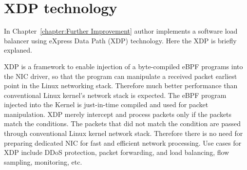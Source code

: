 \FloatBarrier

\section{XDP technology}

In Chapter~\ref{chapter:Further Improvement}  author implements a software load balancer using eXpress Data Path (XDP) \cite{hoiland2018express} technology.
Here the XDP is briefly explaned.

XDP is a framework to enable injection of a byte-compiled eBPF programs into the NIC driver, so that the program can manipulate a received packet  earliest point in the Linux networking stack.
Therefore much better performance than conventional Linux kernel's network stack is expected.
The eBPF program injected into the Kernel is just-in-time compiled and used for packet manipulation.
XDP merely intercept and process packets only if the packets match the conditions.
The packets that did not match the condition are passed through conventional Linux kernel network stack.
Therefore there is no need for preparing dedicated NIC for fast and efficient network processing.
Use cases for XDP include DDoS protection, packet forwarding, and load balancing, flow sampling, monitoring, etc.


